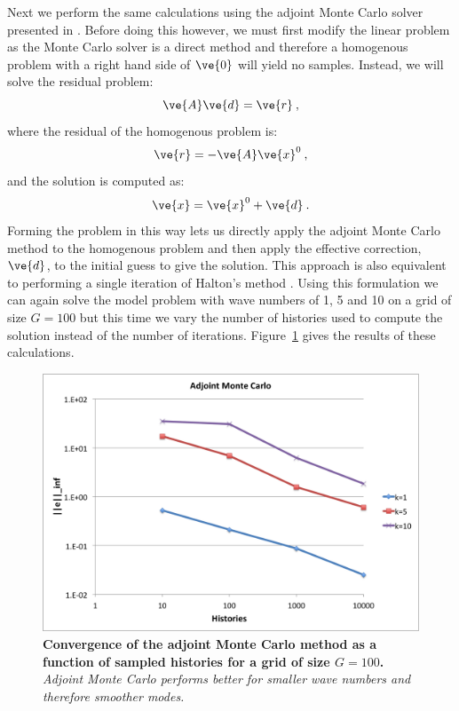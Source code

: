 \documentclass[note]{TechNote}
\begin{document}
Next we perform the same calculations using the adjoint Monte Carlo
solver presented in \cite{evans_monte_2012}. Before doing this
however, we must first modify the linear problem as the Monte Carlo
solver is a direct method and therefore a homogenous problem with a
right hand side of $\ve{0}$ will yield no samples. Instead, we will
solve the residual problem:
\begin{equation}
  \ve{A}\ve{d} = \ve{r}\:,
  \label{eq:residual_problem}
\end{equation}
where the residual of the homogenous problem is:
\begin{equation}
  \ve{r} = -\ve{A}\ve{x}^0\:,
  \label{eq:homogenous_residual}
\end{equation}
and the solution is computed as:
\begin{equation}
  \ve{x} = \ve{x}^0 + \ve{d}\:.
  \label{eq:residual_solution}
\end{equation}
Forming the problem in this way lets us directly apply the adjoint
Monte Carlo method to the homogenous problem and then apply the
effective correction, $\ve{d}$, to the initial guess to give the
solution. This approach is also equivalent to performing a single
iteration of Halton's method \cite{halton_sequential_1962}. Using this
formulation we can again solve the model problem with wave numbers of
1, 5 and 10 on a grid of size $G = 100$ but this time we vary the
number of histories used to compute the solution instead of the number
of iterations. Figure~\ref{fig:adjoint_mc} gives the results of these
calculations.
\begin{figure}[h!]
  \begin{center}
    \includegraphics[width=5in]{adjoint_mc.png}
  \end{center}
  \caption{\textbf{Convergence of the adjoint Monte Carlo method as a
      function of sampled histories for a grid of size $G = 100$.}
    \textit{Adjoint Monte Carlo performs better for smaller wave
      numbers and therefore smoother modes.}}
  \label{fig:adjoint_mc}
\end{figure}
\end{document}
